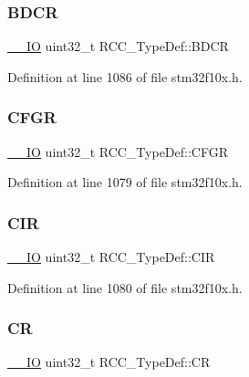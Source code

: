 \subsubsection{\texorpdfstring{B\+D\+CR}{BDCR}}
{\footnotesize\ttfamily \hyperlink{core__sc300_8h_aec43007d9998a0a0e01faede4133d6be}{\+\_\+\+\_\+\+IO} uint32\+\_\+t R\+C\+C\+\_\+\+Type\+Def\+::\+B\+D\+CR}



Definition at line 1086 of file stm32f10x.\+h.

\mbox{\label{struct_r_c_c___type_def_a0721b1b729c313211126709559fad371}} 
\subsubsection{\texorpdfstring{C\+F\+GR}{CFGR}}
{\footnotesize\ttfamily \hyperlink{core__sc300_8h_aec43007d9998a0a0e01faede4133d6be}{\+\_\+\+\_\+\+IO} uint32\+\_\+t R\+C\+C\+\_\+\+Type\+Def\+::\+C\+F\+GR}



Definition at line 1079 of file stm32f10x.\+h.

\mbox{\label{struct_r_c_c___type_def_aeadf3a69dd5795db4638f71938704ff0}} 
\subsubsection{\texorpdfstring{C\+IR}{CIR}}
{\footnotesize\ttfamily \hyperlink{core__sc300_8h_aec43007d9998a0a0e01faede4133d6be}{\+\_\+\+\_\+\+IO} uint32\+\_\+t R\+C\+C\+\_\+\+Type\+Def\+::\+C\+IR}



Definition at line 1080 of file stm32f10x.\+h.

\mbox{\label{struct_r_c_c___type_def_abcb9ff48b9afb990283fefad0554b5b3}} 
\subsubsection{\texorpdfstring{CR}{CR}}
{\footnotesize\ttfamily \hyperlink{core__sc300_8h_aec43007d9998a0a0e01faede4133d6be}{\+\_\+\+\_\+\+IO} uint32\+\_\+t R\+C\+C\+\_\+\+Type\+Def\+::\+CR}



